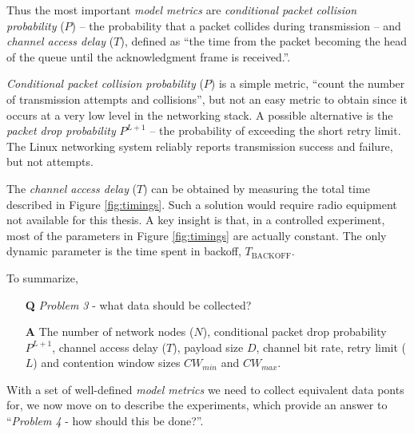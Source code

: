 Thus the most important \emph{model metrics} are \emph{conditional packet
collision probability} ($P$) -- the probability that a packet collides during
transmission -- and \emph{channel access delay} ($T$), defined as ``the time
from the packet becoming the head of the queue until the acknowledgment frame
is received.''.

\emph{Conditional packet collision probability} ($P$) is a simple metric,
``count the number of transmission attempts and collisions'', but not an easy
metric to obtain since it occurs at a very low level in the networking stack.
A possible alternative is the \emph{packet drop probability} $P^{L+1}$ -- the
probability of exceeding the short retry limit. The Linux networking system
reliably reports transmission success and failure, but not attempts.

The \emph{channel access delay} ($T$) can be obtained by measuring the total time
described in Figure \ref{fig:timings}. Such a solution would require radio
equipment not available for this thesis. A key insight is that, in a
controlled experiment, most of the parameters in Figure \ref{fig:timings}
are actually constant. The only dynamic parameter is the time spent in
backoff, $T_{\text{BACKOFF}}$.

To summarize,

\begin{itemize}

    \item[\textbf{Q}] \emph{Problem 3} - what data should be collected?

    \item[\textbf{A}] The number of network nodes ($N$), conditional
    packet drop probability $P^{L+1}$, channel access delay ($T$), payload
    size $D$, channel bit rate, retry limit ($L$) and
    contention window sizes $CW_{min}$ and $CW_{max}$.

\end{itemize}

With a set of well-defined \emph{model metrics} we need to collect equivalent
data ponts for, we now move on to describe the experiments, which provide an
answer to ``\emph{Problem 4} - how should this be done?''.


